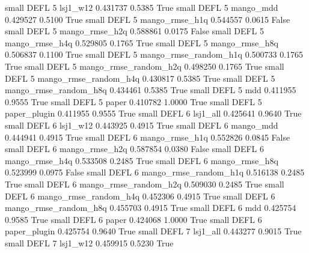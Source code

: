      small     DEFL                 5              lsj1_w12   0.431737      0.5385    True
     small     DEFL                 5             mango_mdd   0.429527      0.5100    True
     small     DEFL                 5        mango_rmse_h1q   0.544557      0.0615   False
     small     DEFL                 5        mango_rmse_h2q   0.588861      0.0175   False
     small     DEFL                 5        mango_rmse_h4q   0.529805      0.1765    True
     small     DEFL                 5        mango_rmse_h8q   0.506837      0.1100    True
     small     DEFL                 5 mango_rmse_random_h1q   0.500733      0.1765    True
     small     DEFL                 5 mango_rmse_random_h2q   0.498250      0.1765    True
     small     DEFL                 5 mango_rmse_random_h4q   0.430817      0.5385    True
     small     DEFL                 5 mango_rmse_random_h8q   0.434461      0.5385    True
     small     DEFL                 5                   mdd   0.411955      0.9555    True
     small     DEFL                 5                 paper   0.410782      1.0000    True
     small     DEFL                 5          paper_plugin   0.411955      0.9555    True
     small     DEFL                 6              lsj1_all   0.425641      0.9640    True
     small     DEFL                 6              lsj1_w12   0.443925      0.4915    True
     small     DEFL                 6             mango_mdd   0.444941      0.4915    True
     small     DEFL                 6        mango_rmse_h1q   0.552826      0.0845   False
     small     DEFL                 6        mango_rmse_h2q   0.587854      0.0380   False
     small     DEFL                 6        mango_rmse_h4q   0.533508      0.2485    True
     small     DEFL                 6        mango_rmse_h8q   0.523999      0.0975   False
     small     DEFL                 6 mango_rmse_random_h1q   0.516138      0.2485    True
     small     DEFL                 6 mango_rmse_random_h2q   0.509030      0.2485    True
     small     DEFL                 6 mango_rmse_random_h4q   0.452306      0.4915    True
     small     DEFL                 6 mango_rmse_random_h8q   0.455703      0.4915    True
     small     DEFL                 6                   mdd   0.425754      0.9585    True
     small     DEFL                 6                 paper   0.424068      1.0000    True
     small     DEFL                 6          paper_plugin   0.425754      0.9640    True
     small     DEFL                 7              lsj1_all   0.443277      0.9015    True
     small     DEFL                 7              lsj1_w12   0.459915      0.5230    True
